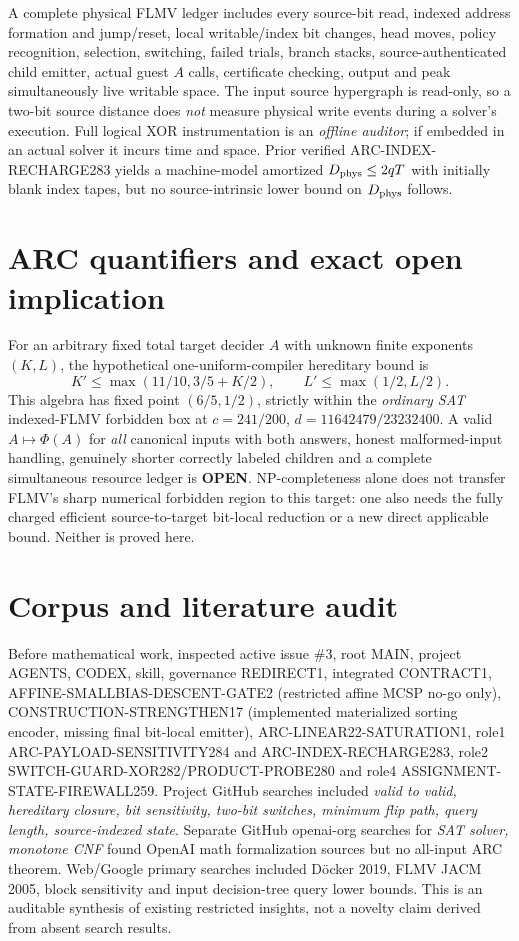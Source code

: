 \documentclass[11pt]{article}
\begin{document}
A complete physical FLMV ledger includes every source-bit read, indexed address formation and jump/reset, local writable/index bit changes, head moves, policy recognition, selection, switching, failed trials, branch stacks, source-authenticated child emitter, actual guest $A$ calls, certificate checking, output and peak simultaneously live writable space. The input source hypergraph is read-only, so a two-bit source distance does \emph{not} measure physical write events during a solver's execution. Full logical XOR instrumentation is an \emph{offline auditor}; if embedded in an actual solver it incurs time and space. Prior verified ARC-INDEX-RECHARGE283 yields a machine-model amortized $D_{\rm phys}\le2qT$ with initially blank index tapes, but no source-intrinsic lower bound on $D_{\rm phys}$ follows.

\section{ARC quantifiers and exact open implication}
For an arbitrary fixed total target decider $A$ with unknown finite exponents $(K,L)$, the hypothetical one-uniform-compiler hereditary bound is
\[
K'\le\max(11/10,3/5+K/2),\qquad
L'\le\max(1/2,L/2).
\]
This algebra has fixed point $(6/5,1/2)$, strictly within the \emph{ordinary SAT} indexed-FLMV forbidden box at $c=241/200$, $d=11642479/23232400$. A valid $A\mapsto\Phi(A)$ for \emph{all} canonical inputs with both answers, honest malformed-input handling, genuinely shorter correctly labeled children and a complete simultaneous resource ledger is \textbf{OPEN}. NP-completeness alone does not transfer FLMV's sharp numerical forbidden region to this target: one also needs the fully charged efficient source-to-target bit-local reduction or a new direct applicable bound. Neither is proved here.

\section{Corpus and literature audit}
Before mathematical work, inspected active issue \#3, root MAIN, project AGENTS, CODEX, skill, governance REDIRECT1, integrated CONTRACT1, AFFINE-SMALLBIAS-DESCENT-GATE2 (restricted affine MCSP no-go only), CONSTRUCTION-STRENGTHEN17 (implemented materialized sorting encoder, missing final bit-local emitter), ARC-LINEAR22-SATURATION1, role1 ARC-PAYLOAD-SENSITIVITY284 and ARC-INDEX-RECHARGE283, role2 SWITCH-GUARD-XOR282/PRODUCT-PROBE280 and role4 ASSIGNMENT-STATE-FIREWALL259. Project GitHub searches included \emph{valid to valid, hereditary closure, bit sensitivity, two-bit switches, minimum flip path, query length, source-indexed state}. Separate GitHub openai-org searches for \emph{SAT solver, monotone CNF} found OpenAI math formalization sources but no all-input ARC theorem. Web/Google primary searches included D\"ocker 2019, FLMV JACM 2005, block sensitivity and input decision-tree query lower bounds. This is an auditable synthesis of existing restricted insights, not a novelty claim derived from absent search results.
\end{document}

